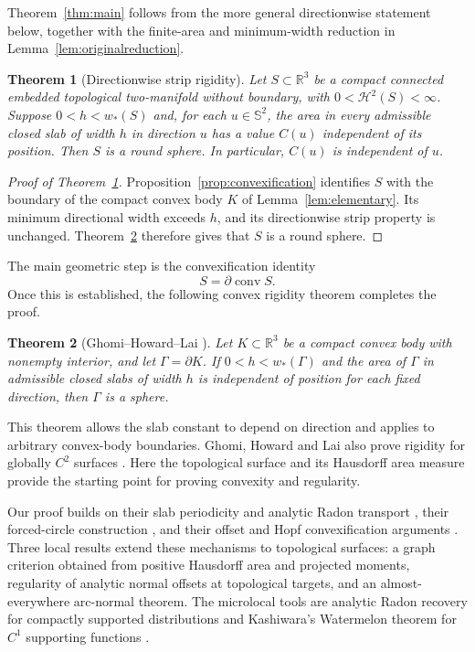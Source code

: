 \documentclass[11pt]{article}
\newtheorem{theorem}{Theorem}[section]
\newcommand{\R}{\mathbb R}
\newcommand{\Sph}{\mathbb S}
\newcommand{\HH}{\mathcal H}
\newcommand{\conv}{\operatorname{conv}}
\begin{document}
Theorem~\ref{thm:main} follows from the more general directionwise statement below, together with the finite-area and minimum-width reduction in Lemma~\ref{lem:originalreduction}.
\begin{theorem}[Directionwise strip rigidity]\label{thm:directional}
Let $S\subset\R^3$ be a compact connected embedded topological two-manifold without boundary, with $0<\HH^2(S)<\infty$. Suppose $0<h<w_*(S)$ and, for each $u\in\Sph^2$, the area in every admissible closed slab of width $h$ in direction $u$ has a value $C(u)$ independent of its position. Then $S$ is a round sphere. In particular, $C(u)$ is independent of $u$.
\end{theorem}
\begin{proof}[Proof of Theorem~\ref{thm:directional}]
Proposition~\ref{prop:convexification} identifies $S$ with the boundary of the compact convex body $K$ of Lemma~\ref{lem:elementary}. Its minimum directional width exceeds $h$, and its directionwise strip property is unchanged. Theorem~\ref{thm:ghl} therefore gives that $S$ is a round sphere.
\end{proof}

The main geometric step is the convexification identity
\[
 S=\partial\conv S.
\]
Once this is established, the following convex rigidity theorem completes the proof.
\begin{theorem}[Ghomi--Howard--Lai {\cite[Theorem 1.1]{GHL}}]\label{thm:ghl}
Let $K\subset\R^3$ be a compact convex body with nonempty interior, and let $\Gamma=\partial K$. If $0<h<w_*(\Gamma)$ and the area of $\Gamma$ in admissible closed slabs of width $h$ is independent of position for each fixed direction, then $\Gamma$ is a sphere.
\end{theorem}
This theorem allows the slab constant to depend on direction and applies to arbitrary convex-body boundaries. Ghomi, Howard and Lai also prove rigidity for globally $C^2$ surfaces \cite[Theorem 1.2]{GHL}. Here the topological surface and its Hausdorff area measure provide the starting point for proving convexity and regularity.

Our proof builds on their slab periodicity and analytic Radon transport \cite[equations (3), (7) and Lemma 5.5, pp.~5, 9]{GHL}, their forced-circle construction \cite[Proposition 5.1, Steps 1--3, pp.~9--10]{GHL}, and their offset and Hopf convexification arguments \cite[Lemma 6.2 and Proposition 6.4, pp.~11--13]{GHL}. Three local results extend these mechanisms to topological surfaces: a graph criterion obtained from positive Hausdorff area and projected moments, regularity of analytic normal offsets at topological targets, and an almost-everywhere arc-normal theorem. The microlocal tools are analytic Radon recovery for compactly supported distributions \cite[Theorem 1.2]{MST} and Kashiwara's Watermelon theorem for $C^1$ supporting functions \cite[Theorem 2.1 and p.~1226]{Horm}.
\end{document}
